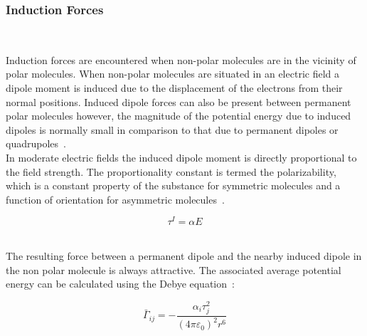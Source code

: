 
\subsubsection{Induction Forces}\

Induction forces are encountered when non-polar molecules are in the vicinity of polar molecules. When non-polar molecules are situated in an electric field a dipole moment is induced due to the displacement of the electrons from their normal positions. Induced dipole forces can also be present between permanent polar molecules however, the magnitude of the potential energy due to induced dipoles is normally small in comparison to that due to permanent dipoles or quadrupoles~\cite{MolecularThermodynamicsOfFluidPhaseEquilibria}.\\

In moderate electric fields the induced dipole moment is directly proportional to the field strength. The proportionality constant is termed the polarizability, which is a constant property of the substance for symmetric molecules and a function of orientation for asymmetric molecules~\cite{MolecularThermodynamicsOfFluidPhaseEquilibria}.\

\begin{equation}
\tau^{I} = \alpha E
\end{equation}\


The resulting force between a permanent dipole and the nearby induced dipole in the non polar molecule is always attractive. The associated average potential energy can be calculated using the Debye equation~\cite{MolecularThermodynamicsOfFluidPhaseEquilibria}:\

\begin{equation}
\bar{\Gamma}_{ij} = -\frac{\alpha_{i}\tau_{j}^{2}}{\left(4\pi\varepsilon_{0}\right)^{2}r^{6}}
\end{equation}\

